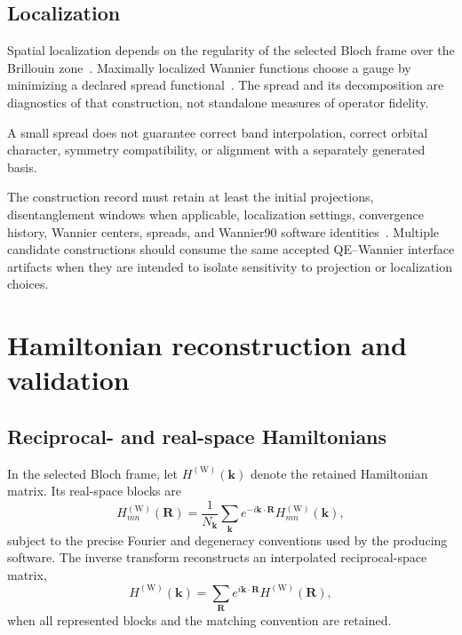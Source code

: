 
\subsection{Localization}


Spatial localization depends on the regularity of the selected Bloch frame over
the Brillouin zone~\cite{kohn1959}. Maximally localized Wannier functions choose
a gauge by minimizing a declared spread functional~\cite{marzari2012}. The
spread and its decomposition are
diagnostics of that construction, not standalone measures of operator fidelity.

A small spread does not guarantee correct band interpolation, correct orbital
character, symmetry compatibility, or alignment with a separately generated
basis.

The construction record must retain at least the initial projections,
disentanglement windows when applicable, localization settings, convergence
history, Wannier centers, spreads, and Wannier90 software
identities~\cite{pizzi2020}. Multiple candidate
constructions should consume the same accepted QE--Wannier interface artifacts
when they are intended to isolate sensitivity to projection or localization
choices.

\section{Hamiltonian reconstruction and validation}

\subsection{Reciprocal- and real-space Hamiltonians}


In the selected Bloch frame, let $H^{(\mathrm W)}(\mathbf k)$ denote the
retained Hamiltonian matrix. Its real-space blocks are
\begin{equation}
  H^{(\mathrm W)}_{mn}(\mathbf R)
  =
  \frac{1}{N_{\mathbf k}}
  \sum_{\mathbf k}e^{-i\mathbf k\cdot\mathbf R}
  H^{(\mathrm W)}_{mn}(\mathbf k),
\end{equation}
subject to the precise Fourier and degeneracy conventions used by the producing
software. The inverse transform reconstructs an interpolated reciprocal-space
matrix,
\begin{equation}
  H^{(\mathrm W)}(\mathbf k)
  =
  \sum_{\mathbf R}e^{i\mathbf k\cdot\mathbf R}
  H^{(\mathrm W)}(\mathbf R),
\end{equation}
when all represented blocks and the matching convention are retained.

